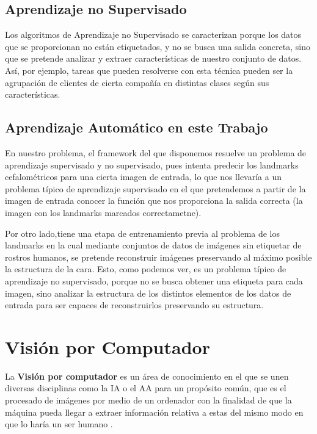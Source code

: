    \subsection{Aprendizaje no Supervisado}
        \noindent Los algoritmos de Aprendizaje no Supervisado se caracterizan porque los datos que se proporcionan no están etiquetados, y no se busca una salida concreta, sino que se pretende analizar y extraer características de nuestro conjunto de datos. Así, por ejemplo, tareas que pueden resolverse con esta técnica pueden ser la agrupación de clientes de cierta compañía en distintas clases según sus características.
    
    \subsection{Aprendizaje Automático en este Trabajo}
        \noindent En nuestro problema, el framework del que disponemos resuelve un problema de aprendizaje supervisado y no supervisado, pues intenta predecir los landmarks cefalométricos para una cierta imagen de entrada, lo que nos llevaría a un problema típico de aprendizaje supervisado en el que pretendemos a partir de la imagen de entrada conocer la función que nos proporciona la salida correcta (la imagen con los landmarks marcados correctametne).

        \medskip

        \noindent Por otro lado,tiene una etapa de entrenamiento previa al problema de los landmarks en la cual mediante conjuntos de datos de imágenes sin etiquetar de rostros humanos, se pretende reconstruir imágenes preservando al máximo posible la estructura de la cara. Esto, como podemos ver, es un problema típico de aprendizaje no supervisado, porque no se busca obtener una etiqueta para cada imagen, sino analizar la estructura de los distintos elementos de los datos de entrada para ser capaces de reconstruirlos preservando su estructura.


\section{Visión por Computador}
    \noindent La \textbf{Visión por computador} es un área de conocimiento en el que se unen diversas disciplinas como la IA o el AA para un propósito común, que es el procesado de imágenes por medio de un ordenador con la finalidad de que la máquina pueda llegar a extraer información relativa a estas del mismo modo en que lo haría un ser humano \cite{rosenfeld1988computer}. 

